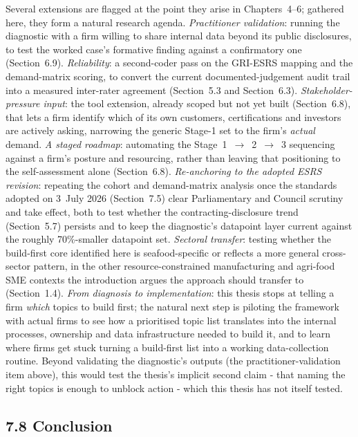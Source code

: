 \documentclass[
]{article}
\begin{document}
Several extensions are flagged at the point they arise in Chapters~4--6;
gathered here, they form a natural research agenda. \emph{Practitioner
validation}: running the diagnostic with a firm willing to share internal
data beyond its public disclosures, to test the worked case's formative
finding against a confirmatory one (Section~6.9). \emph{Reliability}: a
second-coder pass on the GRI-ESRS mapping and the demand-matrix scoring, to
convert the current documented-judgement audit trail into a measured
inter-rater agreement (Section~5.3 and Section~6.3). \emph{Stakeholder-pressure input}:
the tool extension, already scoped but not yet built (Section~6.8), that lets
a firm identify which of its own customers, certifications and investors are
actively asking, narrowing the generic Stage-1 set to the firm's
\emph{actual} demand. \emph{A staged roadmap}: automating the
Stage~1~$\rightarrow$~2~$\rightarrow$~3 sequencing against a firm's posture and
resourcing, rather than leaving that positioning to the self-assessment alone
(Section~6.8). \emph{Re-anchoring to the adopted ESRS revision}: repeating the
cohort and demand-matrix analysis once the standards adopted on 3~July 2026
(Section~7.5) clear Parliamentary and Council scrutiny and take effect, both
to test whether the contracting-disclosure trend
(Section~5.7) persists and to keep the diagnostic's datapoint
layer current against the roughly 70\%-smaller datapoint set.
\emph{Sectoral transfer}: testing whether the build-first core identified here
is seafood-specific or reflects a more general cross-sector pattern, in the
other resource-constrained manufacturing and agri-food SME contexts the
introduction argues the approach should transfer to (Section~1.4).
\emph{From diagnosis to implementation}: this thesis stops at telling a firm
\emph{which} topics to build first; the natural next step is piloting the
framework with actual firms to see how a prioritised topic list translates
into the internal processes, ownership and data infrastructure needed to
build it, and to learn where firms get stuck turning a build-first list into
a working data-collection routine. Beyond validating the diagnostic's
outputs (the practitioner-validation item above), this would test the
thesis's implicit second claim - that naming the right topics is enough to
unblock action - which this thesis has not itself tested.

\subsection{7.8 Conclusion}\label{discussion-conclusion}
\end{document}
